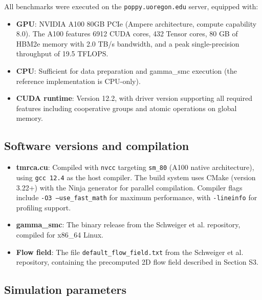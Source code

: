 \documentclass[10pt,letterpaper]{article}
\begin{document}
All benchmarks were executed on the \texttt{poppy.uoregon.edu} server, equipped with:
\begin{itemize}
\item \textbf{GPU}: NVIDIA A100 80GB PCIe (Ampere architecture, compute capability 8.0). The A100 features 6912 CUDA cores, 432 Tensor cores, 80 GB of HBM2e memory with 2.0 TB/s bandwidth, and a peak single-precision throughput of 19.5 TFLOPS.
\item \textbf{CPU}: Sufficient for data preparation and gamma\_smc execution (the reference implementation is CPU-only).
\item \textbf{CUDA runtime}: Version 12.2, with driver version supporting all required features including cooperative groups and atomic operations on global memory.
\end{itemize}

\subsection{Software versions and compilation}

\begin{itemize}
\item \textbf{tmrca.cu}: Compiled with \texttt{nvcc} targeting \texttt{sm\_80} (A100 native architecture), using \texttt{gcc 12.4} as the host compiler. The build system uses CMake (version 3.22+) with the Ninja generator for parallel compilation. Compiler flags include \texttt{-O3 --use\_fast\_math} for maximum performance, with \texttt{-lineinfo} for profiling support.
\item \textbf{gamma\_smc}: The binary release from the Schweiger et al. repository, compiled for x86\_64 Linux.
\item \textbf{Flow field}: The file \texttt{default\_flow\_field.txt} from the Schweiger et al. repository, containing the precomputed 2D flow field described in Section S3.
\end{itemize}

\subsection{Simulation parameters}
\end{document}
